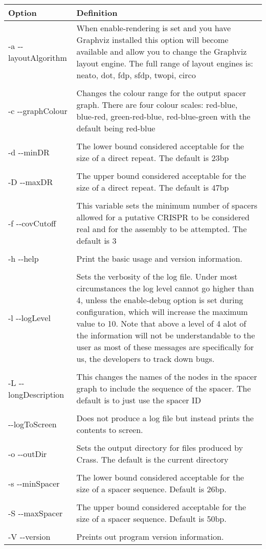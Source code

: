 \documentclass[11pt]{article} %
\begin{document}
    \begin{longtable}{  l   p{10cm} }
    \hline
    Option & Definition \\  \hline\hline
    -a  -{}-layoutAlgorithm &   When enable-rendering is set and you have Graphviz installed this option will become available and allow you to change the Graphviz layout engine.  The full range of layout engines is: neato, dot, fdp, sfdp, twopi, circo \\ \\
-c -{}-graphColour & Changes the colour range for the output spacer graph.  There are four colour scales: red-blue, blue-red, green-red-blue, red-blue-green with the default being red-blue\\ \\
-d -{}-minDR & The lower bound considered acceptable for the size of a direct repeat.  The default is 23bp\\ \\
-D -{}-maxDR & The upper bound considered acceptable for the size of a direct repeat. The default is 47bp\\ \\
-f -{}-covCutoff & This variable sets the minimum number of spacers allowed for a putative CRISPR to be considered real and for the assembly to be attempted.  The default is 3  \\ \\
-h -{}-help & Print the basic usage and version information. \\ \\

-l -{}-logLevel & Sets the verbosity of the log file.  Under most circumstances the log level cannot go higher than 4, unless the enable-debug option is set during configuration, which will increase the maximum value to 10.  Note that above a level of 4 alot of the information will not be understandable to the user as most of these messages are specifically for us, the developers to track down bugs.  \\ \\
-L -{}-longDescription & This changes  the names of the nodes in the spacer graph to include the sequence of the spacer.  The default is to just use the spacer ID\\ \\
-{}-logToScreen & Does not produce a log file but instead prints the contents to screen.\\ \\

-o -{}-outDir & Sets the output directory for files produced by Crass.  The default is the current directory\\ \\
-s -{}-minSpacer & The lower bound considered acceptable for the size of a spacer sequence. Default is 26bp.\\ \\
-S -{}-maxSpacer & The upper bound considered acceptable for the size of a spacer sequence. Default is 50bp.\\ \\
-V -{}-version & Preints out program version information. \\
    \hline
 \end{longtable}
\end{document}
